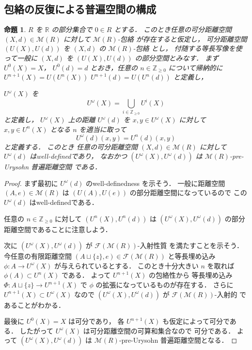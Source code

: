 \documentclass[leqno, 12pt]{jsarticle}
\newtheorem{prop}[thm]{命題}
\newcommand{\zz}{\mathbb{Z}}
\newcommand{\yozz}[1]{\zz_{\ge #1}}
\newcommand{\rr}{\mathbb{R}}
\newcommand{\Met}[1]{\mathscr{M}(#1)}
\newcommand{\FinitePart}[1]{\mathscr{F}(#1)}
\newcommand{\FinMet}[1]{\FinitePart{\Met{#1}}}
\newcommand{\Ustage}[2]{U^{#1}(#2)}
\begin{document}
\subsection{包絡の反復による普遍空間の構成}\label{subsec:envelope:iteration}

\begin{prop}\label{prop:func:envext}
$R$
を
$\rr$
の部分集合で
$0\in R$
とする．
このとき任意の可分距離空間
$(X, d)\in\Met{R}$
に対して
$\Met{R}$-包絡
が存在すると仮定し，
可分距離空間
$(U(X), U(d))$
を
$(X, d)$
の
$\Met{R}$-包絡
とし，
付随する等長写像を使って一般に
$(X, d)$
を
$(U(X), U(d))$
の部分空間とみなす．
まず
$\Ustage{0}{X}=X$，
$\Ustage{0}{d}=d$
とおき，任意の
$n\in\yozz{0}$
について帰納的に
$\Ustage{n+1}{X}=U(\Ustage{n}{X})$
$\Ustage{n+1}{d}=U(\Ustage{n}{d})$
と定義し，

$\Ustage{\omega}{X}$
を
\[
\Ustage{\omega}{X}=\bigcup_{i\in \yozz{0}}\Ustage{i}{X}
\]
と定義し，
$\Ustage{\omega}{X}$
上の距離
$\Ustage{\omega}{d}$
を
$x, y\in \Ustage{\omega}{X}$
に対して
$x, y\in \Ustage{n}{X}$
となる
$n$
を適当に取って
\[
\Ustage{\omega}{d}(x, y)=
\Ustage{n}{d}(x, y)
\]
と定義する．
このとき
任意の可分距離空間
$(X, d)\in \Met{R}$
に対して
$\Ustage{\omega}{d}$
はwell-definedであり，
なおかつ
$(\Ustage{\omega}{X}, \Ustage{\omega}{d})$
は
$\Met{R}$-pre-Urysohn
普遍距離空間
である．
\end{prop}
\begin{proof}
まず最初に
$\Ustage{\omega}{d}$%
のwell-definedness
を示そう．
一般に距離空間
$(A, e)\in \Met{R}$
は
$(U(A), U(e))$
の部分距離空間になっているので
この
$\Ustage{\omega}{d}$
はwell-definedである．




任意の
$n\in \yozz{0}$
に対して
$(\Ustage{n}{X}, \Ustage{n}{d})$
は
$(\Ustage{\omega}{X}, \Ustage{\omega}{d})$
の部分距離空間であることに注意しよう．



次に
$(\Ustage{\omega}{X}, \Ustage{\omega}{d})$
が
$\FinMet{R}$-入射性質
を満たすことを示そう．
今任意の有限距離空間
$(A\sqcup\{z\}, e)\in \FinMet{R}$
と等長埋め込み
$\phi\colon  A\to \Ustage{\omega}{X}$
が与えられているとする．
このとき十分大きい
$n$
を取れば
$\phi(A)\subset \Ustage{n}{X}$
である．
よって
$\Ustage{n+1}{X}$
の包絡性から
等長埋め込み
$\Phi\colon  A\sqcup\{z\}\to \Ustage{n+1}{X}$
で
$\phi$
の拡張になっているものが存在する．
さらに
$\Ustage{n+1}{X}\subset \Ustage{\omega}{X}$
なので
$(\Ustage{\omega}{X}, \Ustage{\omega}{d})$
が
$\FinMet{R}$-入射的
であることがわかる．



最後に
$\Ustage{0}{X}=X$
は可分であり，
各
$\Ustage{n+1}{X}$
も仮定によって可分である．
したがって
$\Ustage{\omega}{X}$
は可分距離空間の可算和集合なので
可分である．
よって
$(\Ustage{\omega}{X}, \Ustage{\omega}{d})$
は
$\Met{R}$-pre-Urysohn
普遍距離空間となる．
\end{proof}
\end{document}
